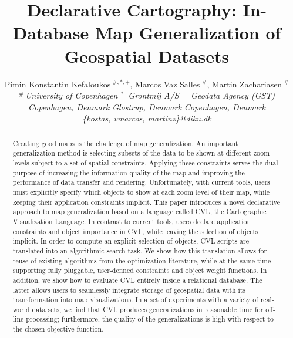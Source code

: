 \documentclass[10pt,conference,letterpaper]{IEEEtran}
\title{Declarative Cartography: In-Database Map Generalization of Geospatial Datasets}
\author{
{Pimin Konstantin Kefaloukos{\small $~^{\#,*,+}$}, Marcos Vaz Salles{\small $~^{\#}$}, Martin Zachariasen{\small $~^{\#}$} }%
\vspace{1.6mm}\\
\fontsize{10}{10}\selectfont\itshape
$^{\#}$\,University of Copenhagen \hspace{3ex} $^{*}$\ Grontmij A/S \hspace{6ex} $^{+}$\ Geodata Agency (GST)         \\
Copenhagen, Denmark \hspace{5ex} Glostrup, Denmark \hspace{6ex} Copenhagen, Denmark\\
\fontsize{9}{9}\selectfont\ttfamily\upshape
\{kostas, vmarcos, martinz\}@diku.dk
}
\newcommand{\martin}[1]{\ \\ \fbox{\parbox{1.0\linewidth}{{\sc Martin}:\\ #1}}}
\begin{document}
\maketitle

\begin{abstract}
Creating good maps is the challenge of map generalization. An important generalization method is selecting subsets of the data to be shown at different zoom-levels subject to a set of spatial constraints. Applying these constraints serves the dual purpose of increasing the information quality of the map and improving the performance of data transfer and rendering.
Unfortunately, with current tools, users must explicitly specify which objects to show at each zoom level of their map, while keeping their application constraints implicit. This paper introduces a novel declarative approach to map generalization based on a language called CVL, the Cartographic Visualization Language. In contrast to current tools, users declare application constraints and object importance in CVL, while leaving the selection of objects implicit. In order to compute an explicit selection of objects, CVL scripts are translated into an algorithmic search task. We show how this translation allows for reuse of existing algorithms from the optimization literature, while at the same time supporting fully pluggable, user-defined constraints and object weight functions. In addition, we show how to evaluate CVL entirely inside a relational database. The latter allows users to seamlessly integrate storage of geospatial data with its transformation into map visualizations. In a set of experiments with a variety of real-world data sets, we find that CVL produces generalizations in reasonable time for off-line processing; furthermore, the quality of the generalizations is high with respect to the chosen objective function.
\end{abstract}























\end{document}
